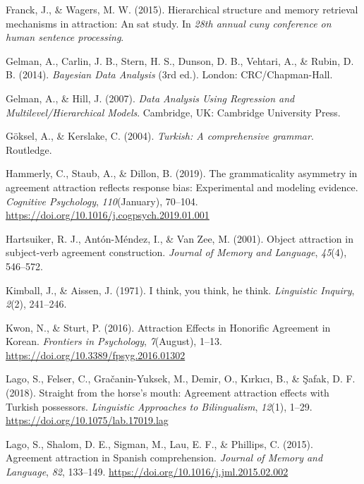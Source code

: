 \documentclass[english,doc]{apa6}
\begin{document}
\leavevmode\hypertarget{ref-Franck2015}{}%
Franck, J., \& Wagers, M. W. (2015). Hierarchical structure and memory retrieval mechanisms in attraction: An sat study. In \emph{28th annual cuny conference on human sentence processing}.

\leavevmode\hypertarget{ref-BDA3}{}%
Gelman, A., Carlin, J. B., Stern, H. S., Dunson, D. B., Vehtari, A., \& Rubin, D. B. (2014). \emph{Bayesian Data Analysis} (3rd ed.). London: CRC/Chapman-Hall.

\leavevmode\hypertarget{ref-GelmanHill:2007}{}%
Gelman, A., \& Hill, J. (2007). \emph{Data Analysis Using Regression and Multilevel/Hierarchical Models}. Cambridge, UK: Cambridge University Press.

\leavevmode\hypertarget{ref-Goksel2004}{}%
Göksel, A., \& Kerslake, C. (2004). \emph{Turkish: A comprehensive grammar}. Routledge.

\leavevmode\hypertarget{ref-HammerlyEtAl:2019}{}%
Hammerly, C., Staub, A., \& Dillon, B. (2019). The grammaticality asymmetry in agreement attraction reflects response bias: Experimental and modeling evidence. \emph{Cognitive Psychology}, \emph{110}(January), 70--104. \url{https://doi.org/10.1016/j.cogpsych.2019.01.001}

\leavevmode\hypertarget{ref-Hartsuiker2001}{}%
Hartsuiker, R. J., Antón-Méndez, I., \& Van Zee, M. (2001). Object attraction in subject-verb agreement construction. \emph{Journal of Memory and Language}, \emph{45}(4), 546--572.

\leavevmode\hypertarget{ref-Kimball1971}{}%
Kimball, J., \& Aissen, J. (1971). I think, you think, he think. \emph{Linguistic Inquiry}, \emph{2}(2), 241--246.

\leavevmode\hypertarget{ref-KwonSturt:2016}{}%
Kwon, N., \& Sturt, P. (2016). Attraction Effects in Honorific Agreement in Korean. \emph{Frontiers in Psychology}, \emph{7}(August), 1--13. \url{https://doi.org/10.3389/fpsyg.2016.01302}

\leavevmode\hypertarget{ref-LagoEtAl:2018}{}%
Lago, S., Felser, C., Gračanin-Yuksek, M., Demir, O., Kırkıcı, B., \& Şafak, D. F. (2018). Straight from the horse's mouth: Agreement attraction effects with Turkish possessors. \emph{Linguistic Approaches to Bilingualism}, \emph{12}(1), 1--29. \url{https://doi.org/10.1075/lab.17019.lag}

\leavevmode\hypertarget{ref-LagoEtAl:2015}{}%
Lago, S., Shalom, D. E., Sigman, M., Lau, E. F., \& Phillips, C. (2015). Agreement attraction in Spanish comprehension. \emph{Journal of Memory and Language}, \emph{82}, 133--149. \url{https://doi.org/10.1016/j.jml.2015.02.002}
\end{document}
